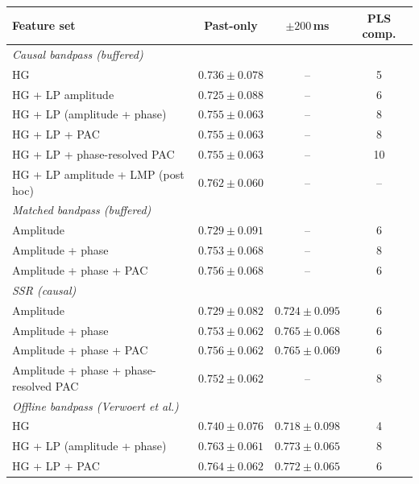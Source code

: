 \begin{tabular}{lccc}
\toprule
\textbf{Feature set} & \textbf{Past-only} & \textbf{$\pm200$\,ms} & \textbf{PLS comp.} \\
\midrule
\multicolumn{4}{l}{\textit{Causal bandpass (buffered)}} \\
\quad HG & $0.736 \pm 0.078$ & -- & 5 \\
\quad HG + LP amplitude & $0.725 \pm 0.088$ & -- & 6 \\
\quad HG + LP (amplitude + phase) & $0.755 \pm 0.063$ & -- & 8 \\
\quad HG + LP + PAC & $0.755 \pm 0.063$ & -- & 8 \\
\quad HG + LP + phase-resolved PAC & $0.755 \pm 0.063$ & -- & 10 \\
\quad HG + LP amplitude + LMP (post hoc) & $0.762 \pm 0.060$ & -- & -- \\
\multicolumn{4}{l}{\textit{Matched bandpass (buffered)}} \\
\quad Amplitude & $0.729 \pm 0.091$ & -- & 6 \\
\quad Amplitude + phase & $0.753 \pm 0.068$ & -- & 8 \\
\quad Amplitude + phase + PAC & $0.756 \pm 0.068$ & -- & 6 \\
\multicolumn{4}{l}{\textit{SSR (causal)}} \\
\quad Amplitude & $0.729 \pm 0.082$ & $0.724 \pm 0.095$ & 6 \\
\quad Amplitude + phase & $0.753 \pm 0.062$ & $0.765 \pm 0.068$ & 6 \\
\quad Amplitude + phase + PAC & $0.756 \pm 0.062$ & $0.765 \pm 0.069$ & 6 \\
\quad Amplitude + phase + phase-resolved PAC & $0.752 \pm 0.062$ & -- & 8 \\
\multicolumn{4}{l}{\textit{Offline bandpass (Verwoert et al.)}} \\
\quad HG & $0.740 \pm 0.076$ & $0.718 \pm 0.098$ & 4 \\
\quad HG + LP (amplitude + phase) & $0.763 \pm 0.061$ & $0.773 \pm 0.065$ & 8 \\
\quad HG + LP + PAC & $0.764 \pm 0.062$ & $0.772 \pm 0.065$ & 6 \\
\bottomrule
\end{tabular}
